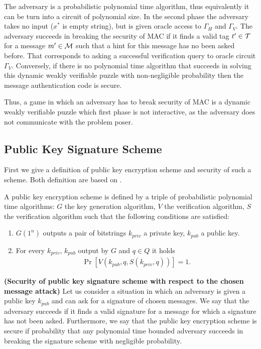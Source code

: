 \documentclass[11pt,a4paper,titlepage]{memoir}
\begin{document}
The adversary is a probabilistic polynomial time algorithm, thus equivalently it can be turn into a circuit of polynomial size.
In the second phase the adversary takes no input ($x^*$ is empty string), but is given oracle access to $\Gamma_H$ and $\Gamma_V$.
The adversary succeeds in breaking the security of MAC if it finds a valid tag $t' \in \mathcal{T}$ for a message $m' \in \mathcal{M}$ such that a hint for this message
has no been asked before. That corresponds to asking a successful verification query to oracle circuit $\Gamma_V$.
Conversely, if there is no polynomial time algorithm that succeeds in solving this dynamic weakly verifiable puzzle with non-negligible probability
then the message authentication code is secure.

Thus, a game in which an adversary has to break security of MAC is a dynamic weakly verifiable puzzle which first phase is not interactive,
as the adversary does not communicate with the problem poser.

\subsection{Public Key Signature Scheme}
First we give a definition of public key encryption scheme and security of such a scheme. Both definition are based on \cite{Goldreich:2004:FCV:975541}.


\begin{definition}
A public key encryption scheme is defined by a triple of probabilistic polynomial time algorithms:
$G$ the key generation algorithm, $V$ the verification algorithm, $S$ the verification algorithm such that the following conditions are satisfied:
\begin{enumerate}[]
  \item $G(1^n)$ outputs a pair of bitstrings $k_{priv}$ a private key, $k_{pub}$ a public key.
  \item For every $k_{priv}$, $k_{pub}$ output by $G$ and $q \in Q$ it holds
    \begin{align*}
      \Pr[V(k_{pub}, q, S(k_{priv}, q))] = 1.
    \end{align*}
\end{enumerate}
\end{definition}


\begin{definition}\textbf{(Security of public key signature scheme with respect to the chosen message attack)}
Let us consider a situation in which an adversary is given a public key $k_{pub}$ and can ask for a signature of chosen messages.
We say that the adversary succeeds if it finds a valid signature for a message for which a signature has not been asked.
Furthermore, we say that the public key encryption scheme is secure if probability that any polynomial time bounded adversary
succeeds in breaking the signature scheme with negligible probability.
\end{definition}
\end{document}
